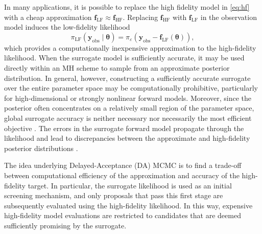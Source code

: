 \documentclass{elsarticle}
\begin{document}
In many applications, it is possible to replace the high fidelity model in \eqref{eq:hf} with a cheap approximation $\mathbf{f}_{\mathrm{LF}}\approx \mathbf{f}_{\mathrm{HF}}$. Replacing $\mathbf{f}_{\mathrm{HF}}$ with $\mathbf{f}_{\mathrm{LF}}$ in the observation model induces the low-fidelity likelihood
\begin{equation}
\label{eq:lf-like-general}
\pi_{\mathrm{LF}}(\mathbf y_{\mathrm{obs}}\mid \boldsymbol{\theta})
=
\pi_{\varepsilon}\left(
\mathbf y_{\mathrm{obs}}-\mathbf f_{\mathrm{LF}}(\boldsymbol{\theta})
\right),
\end{equation}
which provides a computationally inexpensive approximation to the high-fidelity likelihood. When the surrogate model is sufficiently accurate, it may be used directly within an MH scheme to sample from an approximate posterior distribution. In general, however, constructing a sufficiently accurate surrogate over the entire parameter space may be computationally prohibitive, particularly for high-dimensional or strongly nonlinear forward models. Moreover, since the posterior often concentrates on a relatively small region of the parameter space, global surrogate accuracy is neither necessary nor necessarily the most efficient objective \cite{LiMarzouk2014}. The errors in the surrogate forward model propagate through the likelihood and lead to discrepancies between the approximate and high-fidelity posterior distributions \cite{CotterDashtiStuart2010}.

The idea underlying Delayed-Acceptance (DA) MCMC is to find a trade-off between computational efficiency of the approximation and accuracy of the high-fidelity target. In particular, the surrogate likelihood is used as an initial screening mechanism, and only proposals that pass this first stage are subsequently evaluated using the high-fidelity likelihood. In this way, expensive high-fidelity model evaluations are restricted to candidates that are deemed sufficiently promising by the surrogate.
\end{document}
